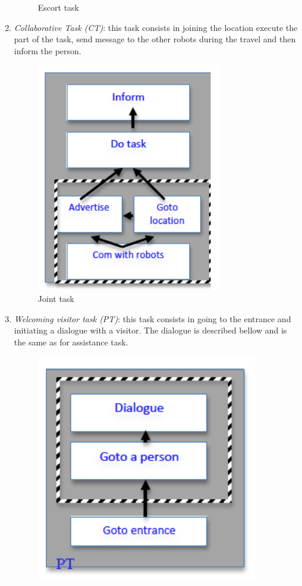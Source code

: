 \documentclass{article}
\begin{document}
\begin{enumerate}
\begin{figure}[htbp]
\begin{center}
\caption{Escort task }
\label{FigEscortTask}
\end{center}
\end{figure}

\item {\it Collaborative Task (CT)}: this task consists in joining the location execute the part of the task, send message to the other robots during the travel and then inform the person.
\begin{figure}[htbp]
\begin{center}
\includegraphics[height=10cm]{fig/JointTask}
\caption{Joint task }
\label{FigjointTask}
\end{center}
\end{figure}
\item {\it Welcoming visitor task  (PT)}: this task consists in going to the entrance and initiating a dialogue with a visitor. The dialogue is described bellow  and is the same as for assistance task. 
\begin{figure}[htbp]
\begin{center}
\includegraphics[height=10cm]{fig/PatrolTask}

\end{center}
\end{figure}
\end{enumerate}
\end{document}
